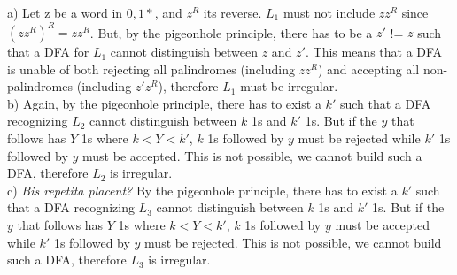 
a) Let z be a word in ${0, 1}*$, and $z^R$ its reverse. $L_1$ must not include $zz^R$ since $(zz^R)^R = zz^R$. 
But, by the pigeonhole principle, there has to be a $z'$ != $z$ such that a DFA for $L_1$ cannot distinguish between $z$ and $z'$. 
This means that a DFA is unable of both rejecting all palindromes (including $zz^R$) and accepting all non-palindromes (including $z'z^R$), therefore $L_1$ must be irregular. \\

b) Again, by the pigeonhole principle, there has to exist a $k'$ such that a DFA recognizing $L_2$ cannot distinguish between $k$ 1s and $k'$ 1s. 
But if the $y$ that follows has $Y$ 1s where $k < Y < k'$, $k$ 1s followed by $y$ must be rejected while $k'$ 1s followed by $y$ must be accepted.
This is not possible, we cannot build such a DFA, therefore $L_2$ is irregular. \\

c) \textit{Bis repetita placent?} By the pigeonhole principle, there has to exist a $k'$ such that a DFA recognizing $L_3$ cannot distinguish between $k$ 1s and $k'$ 1s. 
But if the $y$ that follows has $Y$ 1s where $k < Y < k'$, $k$ 1s followed by $y$ must be accepted while $k'$ 1s followed by $y$ must be rejected.
This is not possible, we cannot build such a DFA, therefore $L_3$ is irregular.
